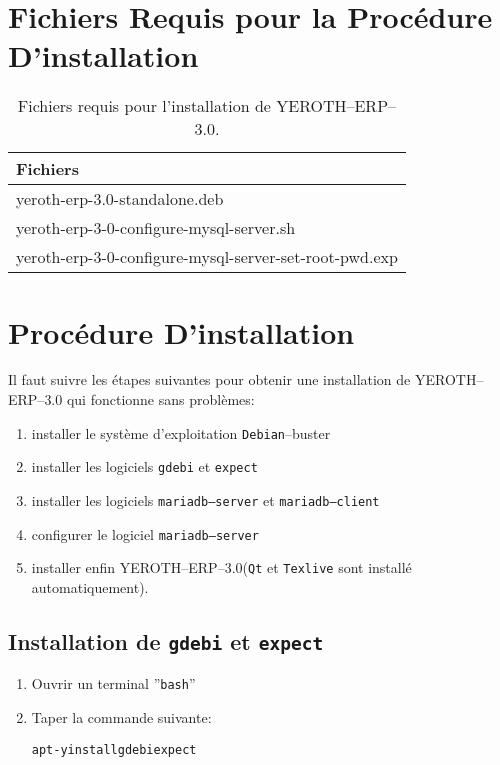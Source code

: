\documentclass[a4paper, 10pt]{article}
\newcommand{\texlive}{\texttt{Texlive}\xspace}
\newcommand{\gdebi}{\texttt{gdebi}\xspace}
\newcommand{\expect}{\texttt{expect}\xspace}
\newcommand{\debian}{\texttt{Debian}\xspace}
\newcommand{\bash}{\texttt{bash}\xspace}
\newcommand{\qt}{\texttt{Qt}\xspace}
\newcommand{\mariadbserver}{\texttt{mariadb--server}\xspace}
\newcommand{\mariadbclient}{\texttt{mariadb--client}\xspace}
\newcommand{\yerotherptroiszero}{\textcolor{yerenColorBlue}{\sc YEROTH--ERP--$3.0$}\xspace}
\newcommand{\rootcommand}[1]{
\begin{center}
\textcolor{purplish}{#1\xspace}
\end{center}}
\begin{document}
\section{Fichiers Requis pour la Proc\'edure D'installation}

\begin{table}[!htbp]
\centering
\begin{tabular}{|l|} \hline
\textbf{Fichiers}		\\ \hline
yeroth-erp-3.0-standalone.deb							\\ \hline
yeroth-erp-3-0-configure-mysql-server.sh				\\ \hline	
yeroth-erp-3-0-configure-mysql-server-set-root-pwd.exp	\\ \hline	
\end{tabular}
\caption{Fichiers requis pour l'installation de \yerotherptroiszero.}
\label{tab:prerequisite-software}
\end{table}

\section{Proc\'edure D'installation}

Il faut suivre les \'etapes suivantes pour obtenir
une installation de \yerotherptroiszero qui fonctionne
sans probl\`emes:

\begin{enumerate} [1)]
	\item installer le syst\`eme d'exploitation \debian--buster
	\item installer les logiciels \gdebi et \expect
	\item installer les logiciels \mariadbserver et \mariadbclient
	\item configurer le logiciel \mariadbserver
	\item installer enfin \yerotherptroiszero (\qt et \texlive sont install\'e automatiquement).
\end{enumerate}

\subsection{Installation de \gdebi et \expect}

\begin{enumerate}[1)]
	\item Ouvrir un terminal ''\bash''
	\item Taper la commande suivante:
		\begin{alltt}
			\rootcommand{apt -y install gdebi expect}
		\end{alltt}
\end{enumerate} 
\end{document}
